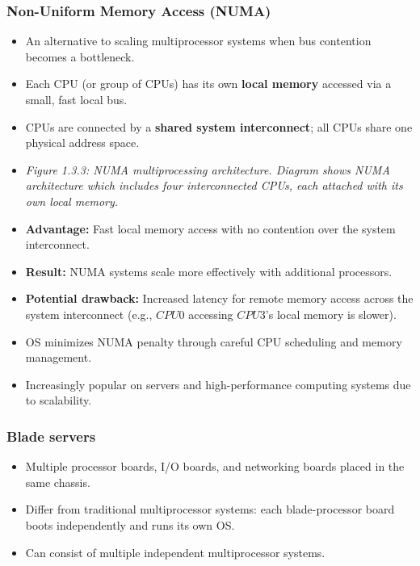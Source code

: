 \documentclass{article}
\begin{document}
\subsubsection*{Non-Uniform Memory Access (NUMA)}
\begin{itemize}
    \item An alternative to scaling multiprocessor systems when bus contention becomes a bottleneck.
    \item Each CPU (or group of CPUs) has its own \textbf{local memory} accessed via a small, fast local bus.
    \item CPUs are connected by a \textbf{shared system interconnect}; all CPUs share one physical address space.
    \item \textit{Figure 1.3.3: NUMA multiprocessing architecture. Diagram shows NUMA architecture which includes four interconnected CPUs, each attached with its own local memory.}
    \item \textbf{Advantage:} Fast local memory access with no contention over the system interconnect.
    \item \textbf{Result:} NUMA systems scale more effectively with additional processors.
    \item \textbf{Potential drawback:} Increased latency for remote memory access across the system interconnect (e.g., $CPU0$ accessing $CPU3$'s local memory is slower).
    \item OS minimizes NUMA penalty through careful CPU scheduling and memory management.
    \item Increasingly popular on servers and high-performance computing systems due to scalability.
\end{itemize}

\subsubsection*{Blade servers}
\begin{itemize}
    \item Multiple processor boards, I/O boards, and networking boards placed in the same chassis.
    \item Differ from traditional multiprocessor systems: each blade-processor board boots independently and runs its own OS.
    \item Can consist of multiple independent multiprocessor systems.
\end{itemize}
\end{document}
